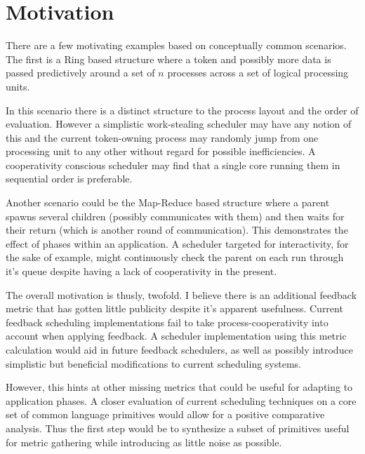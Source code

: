 \section{Motivation}
There are a few motivating examples based on conceptually common scenarios. The first is a Ring based structure 
where a token and possibly more data is passed predictively around a set of $n$ processes across a set of logical
processing units.

In this scenario there is a distinct structure to the process layout and the order of evaluation. However a 
simplistic work-stealing scheduler may have any notion of this and the current token-owning process may randomly
jump from one processing unit to any other without regard for possible inefficiencies. A cooperativity conscious
scheduler may find that a single core running them in sequential order is preferable.

Another scenario could be the Map-Reduce based structure where a parent spawns several children (possibly 
communicates with them) and then waits for their return (which is another round of communication). This 
demonstrates the effect of phases within an application. A scheduler targeted for interactivity, for the sake
of example, might continuously check the parent on each run through it's queue despite having a lack of 
cooperativity in the present.

The overall motivation is thusly, twofold. I believe there is an additional feedback metric that has gotten little
publicity despite it's apparent usefulness. Current feedback scheduling implementations fail to take 
process-cooperativity into account when applying feedback. A scheduler implementation using this metric calculation 
would aid in future feedback schedulers, as well as possibly introduce simplistic but beneficial modifications to 
current scheduling systems.

However, this hints at other missing metrics that could be useful for adapting to application phases. A closer 
evaluation of current scheduling techniques on a core set of common language primitives would allow for a positive
comparative analysis. Thus the first step would be to synthesize a subset of primitives useful for metric gathering 
while introducing as little noise as possible. 

